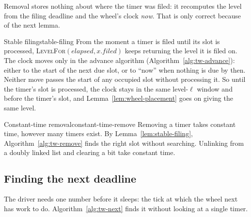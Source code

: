 Removal stores nothing about where the timer was filed: it recomputes the level from the filing deadline and the wheel's clock \emph{now}. That is only correct because of the next lemma.

\begin{lemma}{Stable filing}{stable-filing}
    From the moment a timer is filed until its slot is processed, \textsc{LevelFor}$(\mathit{elapsed}, x.\mathit{filed})$ keeps returning the level it is filed on.
    \why The clock moves only in the advance algorithm (Algorithm~\ref{alg:tw-advance}): either to the start of the next due slot, or to ``now'' when nothing is due by then. Neither move passes the start of any occupied slot without processing it. So until the timer's slot is processed, the clock stays in the same level-$\ell$ window and before the timer's slot, and Lemma~\ref{lem:wheel-placement} goes on giving the same level.
\end{lemma}

\begin{lemma}{Constant-time removal}{constant-time-remove}
    Removing a timer takes constant time, however many timers exist.
    \why By Lemma~\ref{lem:stable-filing}, Algorithm~\ref{alg:tw-remove} finds the right slot without searching. Unlinking from a doubly linked list and clearing a bit take constant time.
\end{lemma}

\subsection{Finding the next deadline}

The driver needs one number before it sleeps: the tick at which the wheel next has work to do. Algorithm~\ref{alg:tw-next} finds it without looking at a single timer.

